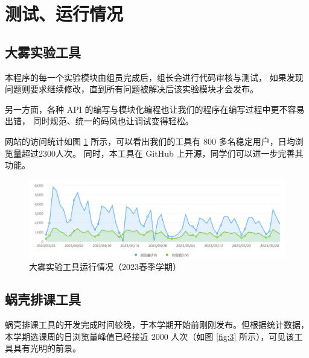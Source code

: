 \section{测试、运行情况}

\subsection{大雾实验工具}

本程序的每一个实验模块由组员完成后，组长会进行代码审核与测试，
如果发现问题则要求继续修改，直到所有问题被解决后该实验模块才会发布。

另一方面，各种 API 的编写与模块化编程也让我们的程序在编写过程中更不容易出错，
同时规范、统一的码风也让调试变得轻松。


网站的访问统计如图 \ref{fig:2} 所示，可以看出我们的工具有 800 多名稳定用户，日均浏览量超过2300人次。
同时，本工具在 GitHub 上开源，同学们可以进一步完善其功能。

\begin{figure}[htbp]
  \centering
  \includegraphics[width=\columnwidth]{figure/2.jpg}
  \caption{大雾实验工具运行情况（2023春季学期）}
  \label{fig:2}
\end{figure}

\subsection{蜗壳排课工具}

蜗壳排课工具的开发完成时间较晚，于本学期开始前刚刚发布。但根据统计数据，本学期选课周的日浏览量峰值已经接近 2000 人次（如图 \ref{fig:3} 所示），可见该工具具有光明的前景。

